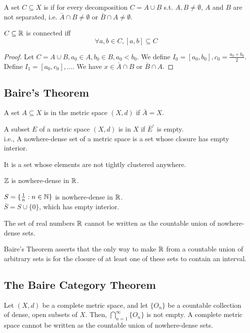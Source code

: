 \documentclass[11pt]{article}
\begin{document}
A set $C \subseteq X$ is  if for every decomposition $C = A \cup B$ s.t. $A, B \neq \emptyset$, $A$ and $B$ are not separated, i.e. $\bar{A} \cap B \neq \emptyset$ or $\bar{B} \cap A \neq \emptyset$.

\property
$C \subseteq \mathbb{R}$ is connected iff $$\forall a,b \in C, [a,b] \subseteq C$$
\begin{proof}
	Let $C = A \cup B, a_0 \in A, b_0 \in B, a_0 < b_0$. We define $I_0 = [a_0, b_0], c_0 = \frac{a_0 + b_0}{2}$. Define $I_1 = [a_0, c_0], \hdots$. We
	have $x \in \bar{A} \cap B$ or $\bar{B} \cap A$. 
\end{proof}


\subsection{Baire's Theorem}

A set $A \subseteq X$ is  in the metric space $(X, d)$ if $\bar{A} = X$. 

A subset $E$ of a metric space $(X, d)$ is  in $X$ if $\bar{E}^\circ$ is empty.\\
i.e., A nowhere-dense set of a metric space is a set whose closure has empty interior.

\remark
It is a set whose elements are not tightly clustered anywhere.

\example
$\mathbb{Z}$ is nowhere-dense in $\mathbb{R}$.

\example
$S = \{\frac{1}{n}: n \in \mathbb{N}\}$ is nowhere-dense in $\mathbb{R}$.\\
$\bar{S} = S \cup \{0\}$, which has empty interior.


The set of real numbers $\mathbb{R}$ cannot be written as the countable union of nowhere-dense sets.

\remark
Baire's Theorem asserts that the only way to make $\mathbb{R}$ from a countable union of arbitrary sets is for the closure of at least one of these sets to contain an interval.

\subsection{The Baire Category Theorem}
\theorem Let $(X, d)$ be a complete metric space, and let $\{O_n\}$ be a countable collection of dense, open subsets of $X$. Then, $\bigcap_{n=1}^\infty\{O_n\}$ is not empty.
A complete metric space cannot be written as the countable union of nowhere-dense sets.
\end{document}
